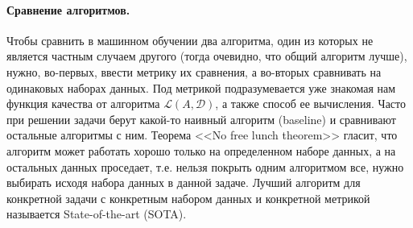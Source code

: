 \documentclass{article}
\begin{document}
    \paragraph{Сравнение алгоритмов.}
    Чтобы сравнить в машинном обучении два алгоритма, один из которых не является частным случаем другого (тогда очевидно, что общий алгоритм лучше), нужно, во-первых, ввести метрику их сравнения, а во-вторых сравнивать на одинаковых наборах данных. Под метрикой подразумевается уже знакомая нам функция качества от алгоритма $\mathcal{L}(A,\mathcal{D})$, а также способ ее вычисления. Часто при решении задачи берут какой-то наивный алгоритм (baseline) и сравнивают остальные алгоритмы с ним. Теорема <<No free lunch theorem>> гласит, что алгоритм может работать хорошо только на определенном наборе данных, а на остальных данных проседает, т.е. нельзя покрыть одним алгоритмом все, нужно выбирать исходя набора данных в данной задаче. Лучший алгоритм для конкретной задачи с конкретным набором данных и конкретной метрикой называется State-of-the-art (SOTA).
\end{document}
